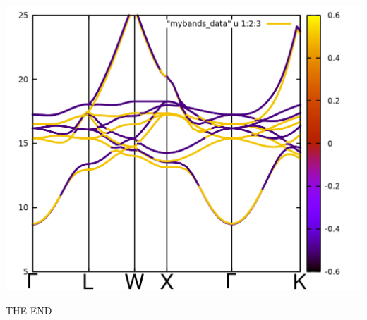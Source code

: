 \documentclass[landscape]{foils}
\begin{document}
\begin{center}
  \includegraphics[width=14cm]{figs/bands_noncollinear.png}
\end{center}
\Head{}
\rightfooter{}
\vfill
\begin{center}
  {\Huge \red THE END}
\end{center}
\vfill
\end{document}
